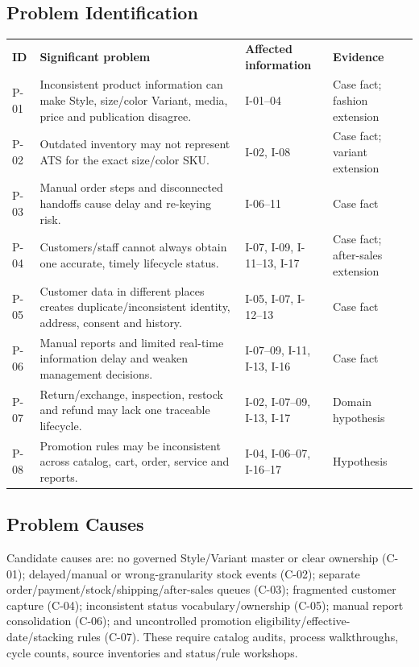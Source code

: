 \documentclass[10pt,a4paper]{article}
\begin{document}
\subsection{Problem Identification}
\begin{tabularx}{\textwidth}{L{9mm}Y L{27mm}L{25mm}}
\textbf{ID} & \textbf{Significant problem} & \textbf{Affected information} & \textbf{Evidence}\\
P-01 & Inconsistent product information can make Style, size/color Variant, media, price and publication disagree. & I-01--04 & Case fact; fashion extension\\
P-02 & Outdated inventory may not represent ATS for the exact size/color SKU. & I-02, I-08 & Case fact; variant extension\\
P-03 & Manual order steps and disconnected handoffs cause delay and re-keying risk. & I-06--11 & Case fact\\
P-04 & Customers/staff cannot always obtain one accurate, timely lifecycle status. & I-07, I-09, I-11--13, I-17 & Case fact; after-sales extension\\
P-05 & Customer data in different places creates duplicate/inconsistent identity, address, consent and history. & I-05, I-07, I-12--13 & Case fact\\
P-06 & Manual reports and limited real-time information delay and weaken management decisions. & I-07--09, I-11, I-13, I-16 & Case fact\\
P-07 & Return/exchange, inspection, restock and refund may lack one traceable lifecycle. & I-02, I-07--09, I-13, I-17 & Domain hypothesis\\
P-08 & Promotion rules may be inconsistent across catalog, cart, order, service and reports. & I-04, I-06--07, I-16--17 & Hypothesis\\
\end{tabularx}

\subsection{Problem Causes}
Candidate causes are: no governed Style/Variant master or clear ownership (C-01); delayed/manual or wrong-granularity stock events (C-02); separate order/payment/stock/shipping/after-sales queues (C-03); fragmented customer capture (C-04); inconsistent status vocabulary/ownership (C-05); manual report consolidation (C-06); and uncontrolled promotion eligibility/effective-date/stacking rules (C-07). These require catalog audits, process walkthroughs, cycle counts, source inventories and status/rule workshops.
\end{document}
